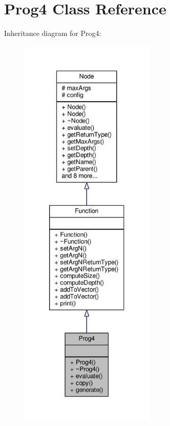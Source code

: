 \hypertarget{classProg4}{}\section{Prog4 Class Reference}
\label{classProg4}


Inheritance diagram for Prog4\+:
\nopagebreak
\begin{figure}[H]
\begin{center}
\leavevmode
\includegraphics[height=550pt]{classProg4__inherit__graph}
\end{center}
\end{figure}


